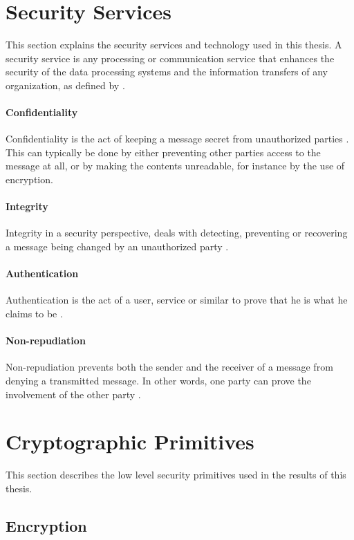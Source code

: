 \documentclass[pdftex,english,10pt,b5paper,twoside]{book}
\begin{document}
\section{Security Services}

This section explains the security services and technology used in this thesis. A security
service is any processing or communication service that enhances the security of
the data processing systems and the information transfers of any organization,
as defined by \citet[p. 12]{stallings}.

\paragraph{Confidentiality} Confidentiality is the act of keeping a message
secret from unauthorized parties \cite[p. 18]{stallings}. This can typically be
done by either preventing other parties access to the message at all, or by making
the contents unreadable, for instance by the use of encryption.

\paragraph{Integrity} Integrity in a security perspective, deals with detecting,
preventing or recovering a message being changed by an unauthorized party
\cite{stallings}.

\paragraph{Authentication} Authentication is the act of a user, service or
similar to prove that he is what he claims to be \cite{stallings}.

\paragraph{Non-repudiation} Non-repudiation prevents both the sender and the receiver of
a message from denying a transmitted message. In other words, one party can
prove the involvement of the other party \cite{stallings}.

\section{Cryptographic Primitives}

This section describes the low level security primitives used in the results of
this thesis.

\subsection{Encryption}
\end{document}
